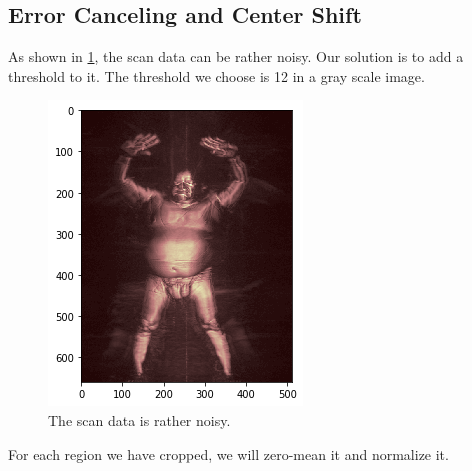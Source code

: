 \documentclass[conference,compsoc]{IEEEtran}
\begin{document}
	\subsection{Error Canceling and Center Shift}
		\par As shown in \ref{noisy}, the scan data can be rather noisy. Our solution is to add a threshold to it. The threshold we choose is 12 in a gray scale image.
		\begin{figure}[h] \label{noisy}
			\centering
			\includegraphics[width=0.7\linewidth]{../Pic/noisy}
			\caption{The scan data is rather noisy.}
		\end{figure}
		\par For each region we have cropped, we will zero-mean it and normalize it.
\end{document}
